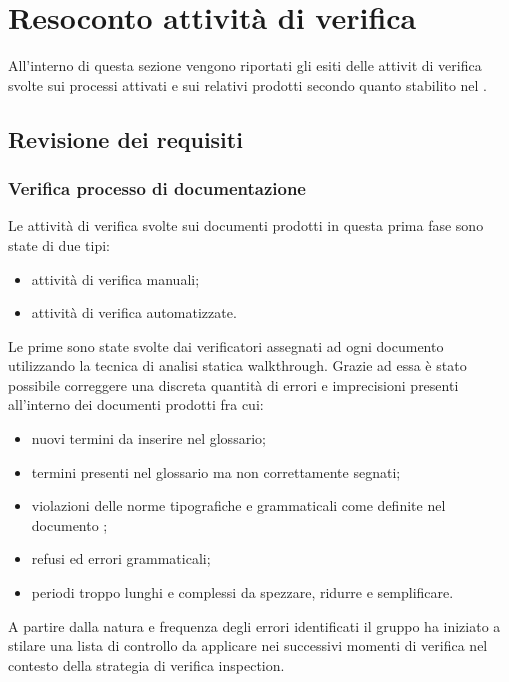 \section{Resoconto attività di verifica}
All'interno di questa sezione vengono riportati gli esiti delle attivit di verifica svolte sui processi attivati e sui relativi prodotti secondo quanto stabilito nel \PdP.
	\subsection{Revisione dei requisiti}
		\subsubsection{Verifica processo di documentazione}
		Le attività di verifica svolte sui documenti prodotti in questa prima fase sono state di due tipi:
		\begin{itemize}		
			\item attività di verifica manuali;
			\item attività di verifica automatizzate.
		\end{itemize}
		
		Le prime sono state svolte dai verificatori assegnati ad ogni documento utilizzando la tecnica di 					analisi statica walkthrough. Grazie ad essa è stato possibile correggere una discreta quantità di 					errori e imprecisioni presenti all'interno dei documenti prodotti fra cui: 
		\begin{itemize}	
			\item nuovi termini da inserire nel glossario;
			\item termini presenti nel glossario ma non correttamente segnati;
			\item violazioni delle norme tipografiche e grammaticali come definite nel documento \NdP ;
			\item refusi ed errori grammaticali;
			\item periodi troppo lunghi e complessi da spezzare, ridurre e semplificare.
		\end{itemize}
		A partire dalla natura e frequenza degli errori identificati il gruppo ha iniziato a stilare una lista
		di controllo da applicare nei successivi momenti di verifica nel contesto della strategia di verifica
		inspection.

